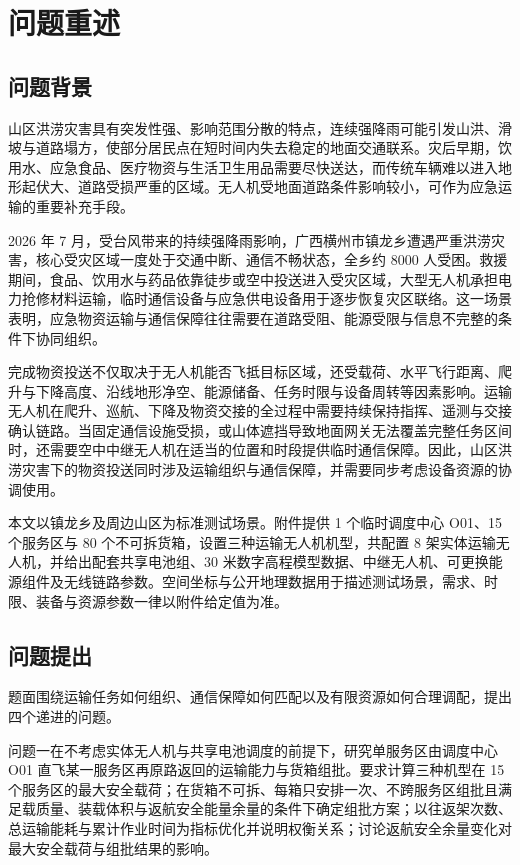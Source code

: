 \documentclass[bwprint]{gmcmthesis}
\begin{document}
\pagestyle{plain}

\maketoc
\clearpage

\section{问题重述}

\subsection{问题背景}
山区洪涝灾害具有突发性强、影响范围分散的特点，连续强降雨可能引发山洪、滑坡与道路塌方，使部分居民点在短时间内失去稳定的地面交通联系。灾后早期，饮用水、应急食品、医疗物资与生活卫生用品需要尽快送达，而传统车辆难以进入地形起伏大、道路受损严重的区域。无人机受地面道路条件影响较小，可作为应急运输的重要补充手段\cite{ref1,ref2}。

2026 年 7 月，受台风带来的持续强降雨影响，广西横州市镇龙乡遭遇严重洪涝灾害，核心受灾区域一度处于交通中断、通信不畅状态，全乡约 8000 人受困\cite{ref2}。救援期间，食品、饮用水与药品依靠徒步或空中投送进入受灾区域，大型无人机承担电力抢修材料运输，临时通信设备与应急供电设备用于逐步恢复灾区联络。这一场景表明，应急物资运输与通信保障往往需要在道路受阻、能源受限与信息不完整的条件下协同组织。

完成物资投送不仅取决于无人机能否飞抵目标区域，还受载荷、水平飞行距离、爬升与下降高度、沿线地形净空、能源储备、任务时限与设备周转等因素影响。运输无人机在爬升、巡航、下降及物资交接的全过程中需要持续保持指挥、遥测与交接确认链路。当固定通信设施受损，或山体遮挡导致地面网关无法覆盖完整任务区间时，还需要空中中继无人机在适当的位置和时段提供临时通信保障\cite{ref8}。因此，山区洪涝灾害下的物资投送同时涉及运输组织与通信保障，并需要同步考虑设备资源的协调使用。

本文以镇龙乡及周边山区为标准测试场景。附件提供 1 个临时调度中心 O01、15 个服务区与 80 个不可拆货箱，设置三种运输无人机机型，共配置 8 架实体运输无人机，并给出配套共享电池组、30 米数字高程模型数据、中继无人机、可更换能源组件及无线链路参数。空间坐标与公开地理数据用于描述测试场景，需求、时限、装备与资源参数一律以附件给定值为准。

\subsection{问题提出}
题面围绕运输任务如何组织、通信保障如何匹配以及有限资源如何合理调配，提出四个递进的问题。

问题一在不考虑实体无人机与共享电池调度的前提下，研究单服务区由调度中心 O01 直飞某一服务区再原路返回的运输能力与货箱组批。要求计算三种机型在 15 个服务区的最大安全载荷；在货箱不可拆、每箱只安排一次、不跨服务区组批且满足载质量、装载体积与返航安全能量余量的条件下确定组批方案；以往返架次数、总运输能耗与累计作业时间为指标优化并说明权衡关系；讨论返航安全余量变化对最大安全载荷与组批结果的影响。
\end{document}
